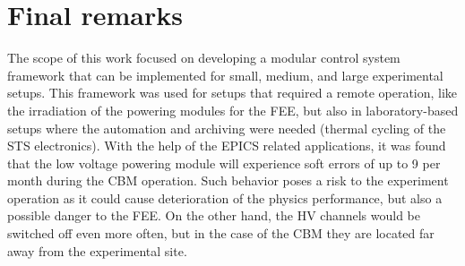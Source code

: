 



\section{Final remarks}

The scope of this work focused on developing a modular control system framework that can be implemented for small, medium, and large experimental setups. This framework was used for setups that required a remote operation, like the irradiation of the powering modules for the \gls{FEE}, but also in laboratory-based setups where the automation and archiving were needed (thermal cycling of the \gls{STS} electronics).
With the help of the \gls{EPICS} related applications, it was found that the low voltage powering module will experience soft errors of up to 9 per month during the \gls{CBM} operation. Such behavior poses a risk to the experiment operation as it could cause deterioration of the physics performance, but also a possible danger to the \gls{FEE}. On the other hand, the \gls{HV} channels would be switched off even more often, but in the case of the \gls{CBM} they are located far away from the experimental site.

